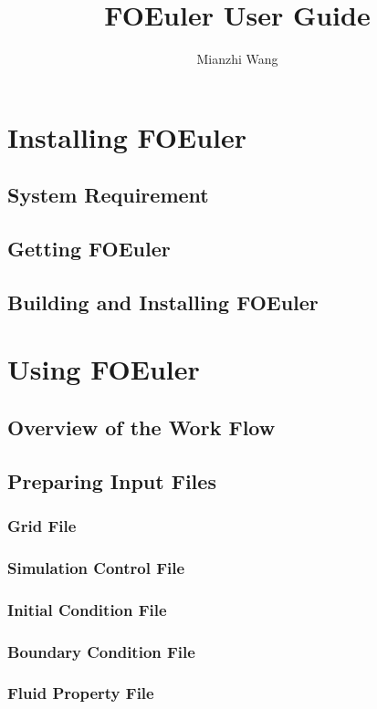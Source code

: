 \documentclass[]{report}
\title{FOEuler User Guide}
\author{Mianzhi Wang}
\begin{document}
\maketitle

\tableofcontents

\chapter{Installing FOEuler}

\section{System Requirement}

\section{Getting FOEuler}

\section{Building and Installing FOEuler}

\chapter{Using FOEuler}

\section{Overview of the Work Flow}

\section{Preparing Input Files}

\subsection{Grid File}

\subsection{Simulation Control File}

\subsection{Initial Condition File}

\subsection{Boundary Condition File}

\subsection{Fluid Property File}
\end{document}
